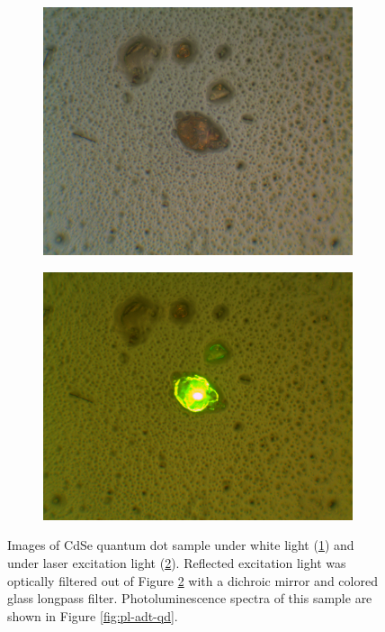 \begin{figure}[H]
    \centering
    \begin{subfigure}[b]{0.45\textwidth}
        \includegraphics[width=\textwidth]{./img/qd-white-illum.png}
        \caption{}
        \label{img:qd-white}
    \end{subfigure}
    \hfill
    \begin{subfigure}[b]{0.45\textwidth}
        \includegraphics[width=\textwidth]{./img/qd-laser-illum.png}
        \caption{}
        \label{img:qd-laser}
    \end{subfigure}
    \caption[Images of CdSe quantum dot sample under white light and under laser excitation light.]{Images of CdSe quantum dot sample under white light (\ref{img:qd-white}) and under laser excitation light (\ref{img:qd-laser}). Reflected excitation light was optically filtered out of Figure \ref{img:qd-laser} with a dichroic mirror and colored glass longpass filter. Photoluminescence spectra of this sample are shown in Figure \ref{fig:pl-adt-qd}.}
    \label{img:qd}
\end{figure}

